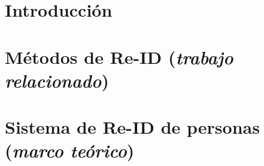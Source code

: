 \documentclass[11pt]{report}
\theoremstyle{definition}
\begin{document}
\tableofcontents %
\pagebreak
\listoftables %

\onehalfspace
\chapter{Introducción}



\chapter{Métodos de Re-ID (\emph{trabajo relacionado})}


\chapter{Sistema de Re-ID de personas (\emph{marco teórico})}





%
\end{document}
